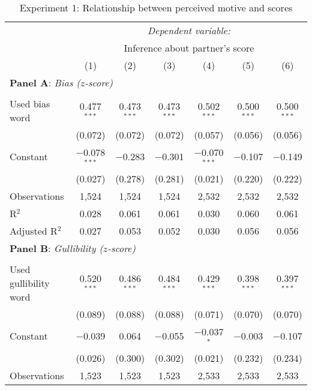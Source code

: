 \begin{table}[!htbp] \centering 
  \caption{Experiment 1: Relationship between perceived motive and scores}
  \label{t:1-validation}
\begin{threeparttable}
\begin{tabular}{@{\hspace{5pt}}l@{\hspace{5pt}}cccccc} 
\toprule 
 & \multicolumn{6}{c}{\textit{Dependent variable:}} \\ 
\cmidrule(rr){2-7} 
 & \multicolumn{6}{c}{Inference about partner's score} \\ 
 & (1) & (2) & (3) & (4) & (5) & (6)\\ 
\midrule  
\midrule
\multicolumn{7}{l}{\textbf{Panel A}: \textit{Bias ($z$-score)}} \\
\midrule
\\[-2.1ex] Used bias word & 0.477$^{***}$ & 0.473$^{***}$ & 0.473$^{***}$ & 0.502$^{***}$ & 0.500$^{***}$ & 0.500$^{***}$ \\ 
  & (0.072) & (0.072) & (0.072) & (0.057) & (0.056) & (0.056) \\ 
 \addlinespace 
 Constant & $-$0.078$^{***}$ & $-$0.283 & $-$0.301 & $-$0.070$^{***}$ & $-$0.107 & $-$0.149 \\ 
  & (0.027) & (0.278) & (0.281) & (0.021) & (0.220) & (0.222) \\ 
 \addlinespace 
\midrule  
Observations & 1,524 & 1,524 & 1,524 & 2,532 & 2,532 & 2,532 \\ 
R$^{2}$ & 0.028 & 0.061 & 0.061 & 0.030 & 0.060 & 0.061 \\ 
Adjusted R$^{2}$ & 0.027 & 0.053 & 0.052 & 0.030 & 0.056 & 0.056 \\ 
\midrule
\midrule
\multicolumn{7}{l}{\textbf{Panel B}: \textit{Gullibility ($z$-score)}} \\
\midrule
\\[-2.1ex] Used gullibility word & 0.520$^{***}$ & 0.486$^{***}$ & 0.484$^{***}$ & 0.429$^{***}$ & 0.398$^{***}$ & 0.397$^{***}$ \\ 
  & (0.089) & (0.088) & (0.088) & (0.071) & (0.070) & (0.070) \\ 
 \addlinespace 
 Constant & $-$0.039 & 0.064 & $-$0.055 & $-$0.037$^{*}$ & $-$0.003 & $-$0.107 \\ 
  & (0.026) & (0.300) & (0.302) & (0.021) & (0.232) & (0.234) \\ 
 \addlinespace 
\midrule  
Observations & 1,523 & 1,523 & 1,523 & 2,533 & 2,533 & 2,533 \\ 

\end{tabular}
\end{threeparttable}
\end{table}
